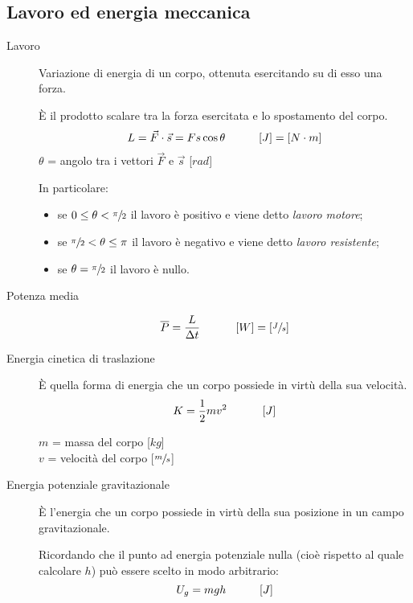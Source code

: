 \documentclass[a4paper,11pt,italian]{article}
\begin{document}
\subsection{Lavoro ed energia meccanica}

\begin{description}
  \item[Lavoro] 
  Variazione di energia di un corpo, ottenuta esercitando su di esso una forza.
  
  È il prodotto scalare tra la forza esercitata e lo spostamento del corpo. 
  \[ L = \vec{F} \cdot \vec{s} = F s \cos\theta \hspace*{3em} [J] = [N\cdot m] \]
  $ \theta $ = angolo tra i vettori $ \vec{F} $ e $ \vec{s} $ [$ rad $]
  
  In particolare:\begin{itemize}
    \item se $ 0 \leq \theta < \sfrac{\pi}{2} $ il lavoro è positivo e viene detto \emph{lavoro motore};
    \item se $ \sfrac{\pi}{2} < \theta \leq \pi $ il lavoro è negativo e viene detto \emph{lavoro resistente};
    \item se $ \theta = \sfrac{\pi}{2} $ il lavoro è nullo.
  \end{itemize}
  
  \item[Potenza media] 
  \[ \overline{P} = \frac{L}{\Delta t} \hspace*{3em} \left[ W \right] = \left[ \sfrac{J}{s} \right] \]
  
  \item[Energia cinetica di traslazione] 
  È quella forma di energia che un corpo possiede in virtù della sua velocità.
  \[ K = \frac{1}{2} mv^2 \hspace*{3em} \left[ J \right]\]
  \begin{multicols}{2}
  $ m $ = massa del corpo [$ kg $]\\
  $ v $ = velocità del corpo [$ \sfrac{m}{s} $]
  \end{multicols}
  
  \item[Energia potenziale gravitazionale] 
  È l'energia che un corpo possiede in virtù della sua posizione in un campo gravitazionale.
  
  Ricordando che il punto ad energia potenziale nulla (cioè rispetto al quale calcolare $ h $) può essere scelto in modo arbitrario: 
  \[ U_g = mgh \hspace*{3em} [J] \]
  

\end{description}
\end{document}
